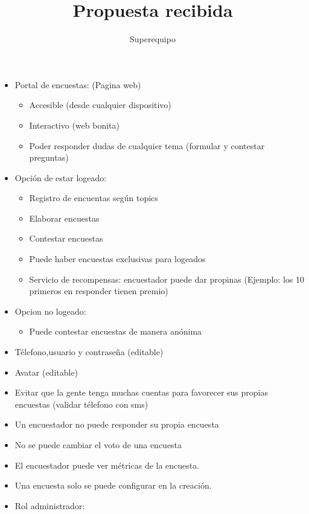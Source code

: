 \documentclass{article}
\title{Propuesta recibida}
\author{Superequipo}
\date{}
\begin{document}
	\maketitle
	\begin{itemize}
        \item Portal de encuestas: (Pagina web)
        \begin{itemize}
            \item Accesible (desde cualquier dispositivo)
            \item Interactivo (web bonita)
            \item Poder responder dudas de cualquier tema (formular y contestar preguntas)
        \end{itemize}
        \item Opción de estar logeado:
        \begin{itemize}
            \item Registro de encuentas según topics
            \item Elaborar encuestas
            \item Contestar encuestas
            \item Puede haber encuestas exclusivas para logeados
            \item Servicio de recompensas: encuestador puede dar propinas (Ejemplo: los 10 primeros en responder tienen premio)
        \end{itemize}
        \item Opcion no logeado:
        \begin{itemize}
            \item Puede contestar encuestas de manera anónima
        \end{itemize}
        \item Télefono,usuario y contraseña (editable)
        \item Avatar (editable)
        \item Evitar que la gente tenga muchas cuentas para favorecer sus propias encuestas (validar télefono con sms)
        \item Un encuestador no puede responder su propia encuesta
        \item No se puede cambiar el voto de una encuesta
        \item El encuestador puede ver métricas de la encuesta.
        \item Una encuesta solo se puede configurar en la creación.
        \item Rol administrador:
        \begin{itemize}

\end{itemize}
\end{itemize}
\end{document}
